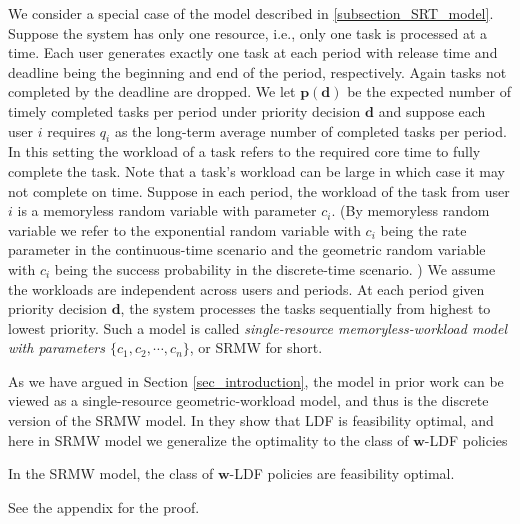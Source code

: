 \documentclass[prodmode,acmtompecs]{acmsmall}
\newcommand{\myComments}[1]{}
\newif\ifdissertation
\newcommand{\dissertationStart}{\ifdissertation  \myComments{Dissertation version: }}
\newcommand{\commentEnd}{\myComments{End}}
\begin{document}
We consider a special case of the model described in \ref{subsection_SRT_model}. Suppose the system has only one resource, i.e., only one task is processed at a time. Each user generates exactly one task at each period with release time and deadline being the beginning and end of the period, respectively. Again tasks not completed by the deadline are dropped.
We let $\mathbf{p}(\mathbf{d})$ be the expected number of timely completed tasks per period under priority decision $\mathbf{d}$ and suppose each user $i$ requires $q_i$ as the long-term average number of completed tasks per period. 
In this setting the workload of a task refers to the required core time to fully complete the task. Note that a task's workload can be large in which case it may not complete on time. 
Suppose in each period, the workload of the task from user $i$ is a memoryless random variable with parameter $c_i$. (By memoryless random variable we refer to the exponential random variable with $c_i$ being the rate parameter in the continuous-time scenario and the geometric random variable with $c_i$ being the success probability in the discrete-time scenario. ) We assume the workloads are independent across users and periods. At each period given priority decision $\mathbf{d}$, the system processes the tasks sequentially from highest to lowest priority. Such a model is called {\em single-resource memoryless-workload model with parameters $\{c_1, c_2, \cdots, c_n\}$}, or SRMW for short. 

As we have argued in Section \ref{sec_introduction}, the model in prior work \cite{HoK12} can be viewed as a single-resource geometric-workload model, and thus is the discrete version of the SRMW model. In \cite{HoK12} they show that LDF is feasibility optimal, and here in SRMW model we generalize the optimality to the class of $\mathbf{w}$-LDF policies

\begin{corollary}
\label{corollary_SCMW}
In the SRMW model, the class of $\mathbf{w}$-LDF policies are feasibility optimal. 
\end{corollary}

See the appendix for the proof. 
\commentEnd\fi

\dissertationStart
This subsection should also go to dissertation, probably with the following paragraph. 

This SRMW model is a generalized version of the system model in \cite{HoK12}. The work in \cite{HoK12} studies a discrete-time wireless model where $n$ users are competing to transmit a packet to the server at each period of length $\delta$ time slots. The deadlines of the packets are the end of the period. If user $i$ is scheduled at a time slot, it successfully transmits the packet with probability $c_i$ and will re-transmit if it fails until the period ends. Therefore, the workload, i.e., the time to successfully transmit a packet from user $i$ is a geometric random variable with success parameter $c_i$. In \cite{HoK12} they show that LDF is feasibility optimal.
\commentEnd\fi
\end{document}
